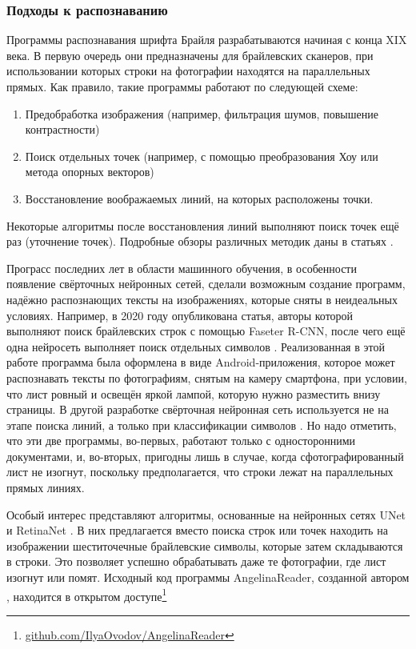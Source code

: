 \documentclass{main.tex}[subfiles]
\begin{document}
\subsubsection{Подходы к распознаванию}
Программы распознавания шрифта Брайля разрабатываются начиная с конца XIX века.
В первую очередь они предназначены для брайлевских сканеров, при использовании которых строки на фотографии находятся на параллельных прямых.
Как правило, такие программы работают по следующей схеме:
\begin{enumerate}[noitemsep]
    \item Предобработка изображения (например, фильтрация шумов, повышение контрастности)
    \item Поиск отдельных точек (например, с помощью преобразования Хоу или метода опорных векторов)
    \item Восстановление воображаемых линий, на которых расположены точки.
\end{enumerate}
Некоторые алгоритмы после восстановления линий выполняют поиск точек ещё раз (уточнение точек).
Подробные обзоры различных методик даны в статьях \cite{isayed2015review, shokat2020review}.

Програсс последних лет в области машинного обучения, в особенности появление свёрточных нейронных сетей, сделали возможным создание программ, надёжно распознающих тексты на изображениях, которые сняты в неидеальных условиях.
Например, в 2020 году опубликована статья, авторы которой выполняют поиск брайлевских строк с помощью Faseter R-CNN, после чего ещё одна нейросеть выполняет поиск отдельных символов \cite{baumgartner2020app}.
Реализованная в этой работе программа была оформлена в виде Android-приложения, которое может распознавать тексты по фотографиям, снятым на камеру смартфона, при условии, что лист ровный и освещён яркой лампой, которую нужно разместить внизу страницы.
В другой разработке свёрточная нейронная сеть используется не на этапе поиска линий, а только при классификации символов \cite{alsalman2021}.
Но надо отметить, что эти две программы, во-первых, работают только с односторонними документами, и, во-вторых, пригодны лишь в случае, когда сфотографированный лист не изогнут, поскольку предполагается, что строки лежат на параллельных прямых линиях.

Особый интерес представляют алгоритмы, основанные на нейронных сетях UNet \cite{li2020braunet} и RetinaNet \cite{ovodov2020, ovodov2021}.
В них предлагается вместо поиска строк или точек находить на изображении шеститочечные брайлевские символы, которые затем складываются в строки.
Это позволяет успешно обрабатывать даже те фотографии, где лист изогнут или помят.
Исходный код программы AngelinaReader, созданной автором \cite{ovodov2020, ovodov2021}, находится в открытом доступе\footnote{\href{https://github.com/IlyaOvodov/AngelinaReader}{github.com/IlyaOvodov/AngelinaReader}}
\end{document}
